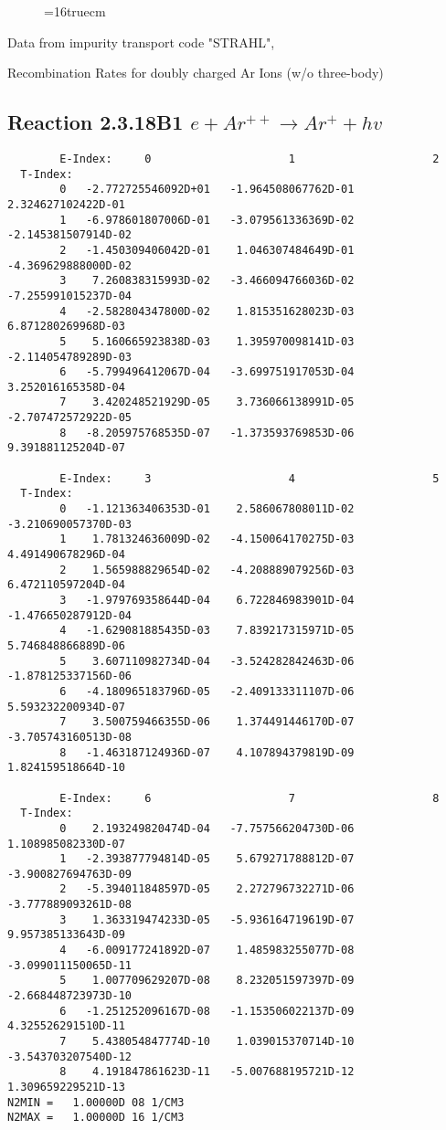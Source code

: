 \documentclass[12pt,dvipdfmx]{article}
\begin{document}
\begin{figure} \label{2.3.18B0}
\epsfxsize=16truecm
\end{figure}
\newpage
Data from impurity transport code "STRAHL", \cite{kn:Behringer}

  Recombination Rates for doubly charged Ar Ions (w/o three-body)
\subsection{
Reaction 2.3.18B1   $  e + Ar^{++} \rightarrow  Ar^+ + hv$
}


\begin{small}\begin{verbatim}
        E-Index:     0                     1                     2
  T-Index:
        0   -2.772725546092D+01   -1.964508067762D-01    2.324627102422D-01
        1   -6.978601807006D-01   -3.079561336369D-02   -2.145381507914D-02
        2   -1.450309406042D-01    1.046307484649D-01   -4.369629888000D-02
        3    7.260838315993D-02   -3.466094766036D-02   -7.255991015237D-04
        4   -2.582804347800D-02    1.815351628023D-03    6.871280269968D-03
        5    5.160665923838D-03    1.395970098141D-03   -2.114054789289D-03
        6   -5.799496412067D-04   -3.699751917053D-04    3.252016165358D-04
        7    3.420248521929D-05    3.736066138991D-05   -2.707472572922D-05
        8   -8.205975768535D-07   -1.373593769853D-06    9.391881125204D-07

        E-Index:     3                     4                     5
  T-Index:
        0   -1.121363406353D-01    2.586067808011D-02   -3.210690057370D-03
        1    1.781324636009D-02   -4.150064170275D-03    4.491490678296D-04
        2    1.565988829654D-02   -4.208889079256D-03    6.472110597204D-04
        3   -1.979769358644D-04    6.722846983901D-04   -1.476650287912D-04
        4   -1.629081885435D-03    7.839217315971D-05    5.746848866889D-06
        5    3.607110982734D-04   -3.524282842463D-06   -1.878125337156D-06
        6   -4.180965183796D-05   -2.409133311107D-06    5.593232200934D-07
        7    3.500759466355D-06    1.374491446170D-07   -3.705743160513D-08
        8   -1.463187124936D-07    4.107894379819D-09    1.824159518664D-10

        E-Index:     6                     7                     8
  T-Index:
        0    2.193249820474D-04   -7.757566204730D-06    1.108985082330D-07
        1   -2.393877794814D-05    5.679271788812D-07   -3.900827694763D-09
        2   -5.394011848597D-05    2.272796732271D-06   -3.777889093261D-08
        3    1.363319474233D-05   -5.936164719619D-07    9.957385133643D-09
        4   -6.009177241892D-07    1.485983255077D-08   -3.099011150065D-11
        5    1.007709629207D-08    8.232051597397D-09   -2.668448723973D-10
        6   -1.251252096167D-08   -1.153506022137D-09    4.325526291510D-11
        7    5.438054847774D-10    1.039015370714D-10   -3.543703207540D-12
        8    4.191847861623D-11   -5.007688195721D-12    1.309659229521D-13
N2MIN =   1.00000D 08 1/CM3
N2MAX =   1.00000D 16 1/CM3


\end{verbatim}
\end{small}
\end{document}
